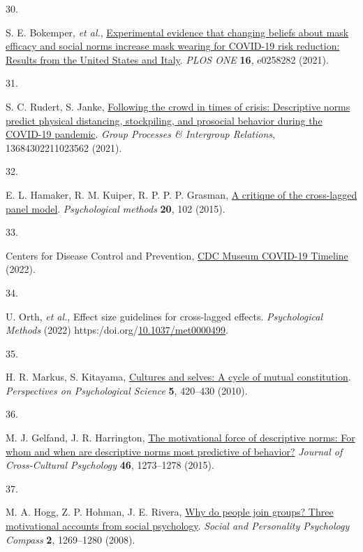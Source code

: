 \documentclass[
  man,floatsintext]{apa6}
\newlength{\cslhangindent}
\newlength{\csllabelwidth}
\newlength{\cslentryspacingunit} %
\newenvironment{CSLReferences}[2] %
 {%
  \setlength{\parindent}{0pt}
  \ifodd #1
  \let\oldpar\par
  \def\par{\hangindent=\cslhangindent\oldpar}
  \fi
  \setlength{\parskip}{#2\cslentryspacingunit}
 }%
 {}
\newcommand{\CSLLeftMargin}[1]{\parbox[t]{\csllabelwidth}{#1}}
\newcommand{\CSLRightInline}[1]{\parbox[t]{\linewidth - \csllabelwidth}{#1}\break}
\begin{document}
\begin{CSLReferences}{0}{0}
\leavevmode{}%
\CSLLeftMargin{30. }%
\CSLRightInline{S. E. Bokemper, \emph{et al.}, \href{https://doi.org/10.1371/journal.pone.0258282}{Experimental evidence that changing beliefs about mask efficacy and social norms increase mask wearing for {COVID-19} risk reduction: Results from the {United States} and {Italy}}. \emph{PLOS ONE} \textbf{16}, e0258282 (2021).}

\leavevmode{}%
\CSLLeftMargin{31. }%
\CSLRightInline{S. C. Rudert, S. Janke, \href{https://doi.org/10.1177/13684302211023562}{Following the crowd in times of crisis: Descriptive norms predict physical distancing, stockpiling, and prosocial behavior during the {COVID-19} pandemic}. \emph{Group Processes \& Intergroup Relations}, 13684302211023562 (2021).}

\leavevmode{}%
\CSLLeftMargin{32. }%
\CSLRightInline{E. L. Hamaker, R. M. Kuiper, R. P. P. P. Grasman, \href{https://doi.org/10.1037/a0038889}{A critique of the cross-lagged panel model}. \emph{Psychological methods} \textbf{20}, 102 (2015).}

\leavevmode{}%
\CSLLeftMargin{33. }%
\CSLRightInline{Centers for Disease Control and Prevention, \href{https://www.cdc.gov/museum/timeline/covid19.html}{{CDC Museum COVID-19 Timeline}} (2022).}

\leavevmode{}%
\CSLLeftMargin{34. }%
\CSLRightInline{U. Orth, \emph{et al.}, Effect size guidelines for cross-lagged effects. \emph{Psychological Methods} (2022) https:/doi.org/\href{https://doi.org/10.1037/met0000499}{10.1037/met0000499}.}

\leavevmode{}%
\CSLLeftMargin{35. }%
\CSLRightInline{H. R. Markus, S. Kitayama, \href{https://doi.org/10.1177/1745691610375557}{Cultures and selves: A cycle of mutual constitution}. \emph{Perspectives on Psychological Science} \textbf{5}, 420--430 (2010).}

\leavevmode{}%
\CSLLeftMargin{36. }%
\CSLRightInline{M. J. Gelfand, J. R. Harrington, \href{https://doi.org/10.1177/0022022115600796}{The motivational force of descriptive norms: For whom and when are descriptive norms most predictive of behavior?} \emph{Journal of Cross-Cultural Psychology} \textbf{46}, 1273--1278 (2015).}

\leavevmode{}%
\CSLLeftMargin{37. }%
\CSLRightInline{M. A. Hogg, Z. P. Hohman, J. E. Rivera, \href{https://doi.org/10.1111/j.1751-9004.2008.00099.x}{Why do people join groups? Three motivational accounts from social psychology}. \emph{Social and Personality Psychology Compass} \textbf{2}, 1269--1280 (2008).}


\end{CSLReferences}
\end{document}
